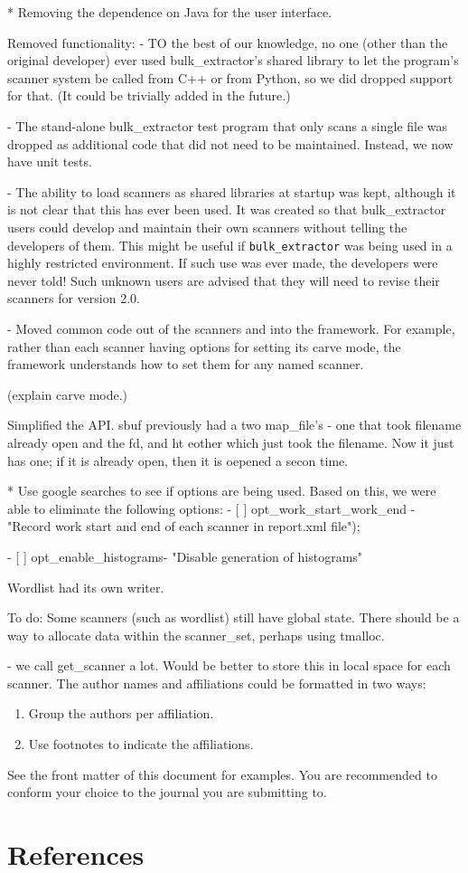 \documentclass[5p]{elsarticle}
\newcommand{\be}{\texttt{bulk\_extractor}\xspace}
\begin{document}
* Removing the dependence on Java for the user interface.



Removed functionality:
- TO the best of our knowledge, no one (other than the original
developer) ever used bulk\_extractor's shared library to let the
program's scanner system be called from C++ or from Python, so we did
dropped support for that. (It could be trivially added in the future.)

- The stand-alone bulk\_extractor test program that only scans a single
file was dropped as additional code that did not need to be
maintained. Instead, we now have unit tests.

- The ability to load scanners as shared libraries at startup was
kept, although it is not clear that this has ever been used. It was
created so that bulk\_extractor users could develop and maintain their
own scanners without telling the developers of them. This might be
useful if \be was being used in a highly restricted environment. If
such use was ever made, the developers were never told! Such unknown
users are advised that they will need to revise their scanners for
version 2.0.


- Moved common code out of the scanners and into the framework. For
example, rather than each scanner having options for setting its carve
mode, the framework understands how to set them for any named
scanner.

(explain carve mode.)

Simplified the API. sbuf previously had a two map\_file's - one that
took filename already open and the fd, and ht eother which just took
the filename. Now it just has one; if it is already open, then it is
oepened a secon time.


* Use google searches to see if options are being used. Based on this,
we were able to eliminate the following options:
- [ ] opt\_work\_start\_work\_end - "Record work start and end of each scanner in report.xml file");

- [ ] opt\_enable\_histograms- "Disable generation of histograms"

Wordlist had its own writer.


To do:
Some scanners (such as wordlist) still have global state. There should
be a way to allocate data within the scanner\_set, perhaps using
tmalloc.

- we call get\_scanner a lot. Would be better to store this in local
space for each scanner.
The author names and affiliations could be formatted in two ways:
\begin{enumerate}[(1)]
\item Group the authors per affiliation.
\item Use footnotes to indicate the affiliations.
\end{enumerate}
See the front matter of this document for examples. You are recommended to conform your choice to the journal you are submitting to.


\section*{References}


\end{document}
